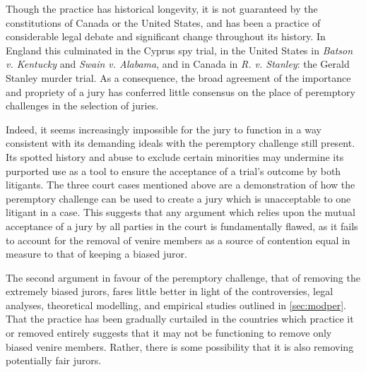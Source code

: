 Though the practice has historical longevity, it is not guaranteed by the constitutions of Canada or the United States, and has
been a practice of considerable legal debate and significant change throughout its history. In England this culminated in the
Cyprus spy trial, in the United States in \textit{Batson v. Kentucky} and \textit{Swain v. Alabama}, and in Canada in
\textit{R. v. Stanley}: the Gerald Stanley  murder trial. As a consequence, the broad agreement of the importance and propriety of
a jury has conferred little consensus on the place of peremptory challenges in the selection of juries.

Indeed, it seems increasingly impossible for the jury to function in a way consistent with its demanding ideals with the
peremptory challenge still present. Its spotted history and abuse to exclude certain minorities may undermine its purported use as a
tool to ensure the acceptance of a trial's outcome by both litigants. The three court cases mentioned above are a demonstration of 
how the peremptory challenge can be used to create a jury which is unacceptable to one litigant in a case. This suggests that
any argument which relies upon the mutual acceptance of a jury by all parties in the court is fundamentally flawed, as it fails to
account for the removal of venire members as a source of contention equal in measure to that of keeping a biased juror.

The second argument in favour of the peremptory challenge, that of removing the extremely biased jurors, fares little better in
light of the controversies, legal analyses, theoretical modelling, and empirical studies outlined in \ref{sec:modper}. That the
practice has been gradually curtailed in the countries which practice it or removed entirely suggests that it may not be
functioning to remove only biased venire members. Rather, there is some possibility that it is also removing potentially fair
jurors.
